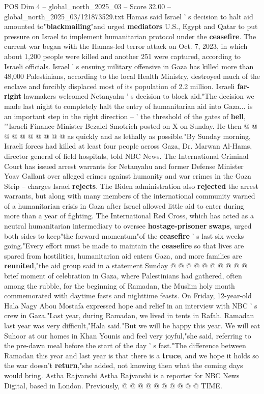 \begin{textsample}{POS Dim 4 – global\_north\_2025\_03 – Score 32.00 – global\_north\_2025\_03/121873529.txt}
Hamas said Israel ' s decision to halt aid amounted to"\textbf{blackmailing}"and urged \textbf{mediators} U.S., Egypt and Qatar to put pressure on Israel to implement humanitarian protocol under the \textbf{ceasefire}.
The current war began with the Hamas-led terror attack on Oct. 7, 2023, in which about 1,200 people were killed and another 251 were captured, according to Israeli officials.
Israel ' s ensuing military offensive in Gaza has killed more than 48,000 Palestinians, according to the local Health Ministry, destroyed much of the enclave and forcibly displaced most of its population of 2.2 million.
Israeli \textbf{far-right} lawmakers welcomed Netanyahu ' s decision to block aid."The decision we made last night to completely halt the entry of humanitarian aid into Gaza... is an important step in the right direction -- ' the threshold of the gates of \textbf{hell}, '"Israeli Finance Minister Bezalel Smotrich posted on X on Sunday.
He then @ @ @ @ @ @ @ @ @ @ as quickly and as lethally as possible."By Sunday morning, Israeli forces had killed at least four people across Gaza, Dr.
Marwan Al-Hams, director general of field hospitals, told NBC News.
The International Criminal Court has issued arrest warrants for Netanyahu and former Defense Minister Yoav Gallant over alleged crimes against humanity and war crimes in the Gaza Strip -- charges Israel \textbf{rejects}.
The Biden administration also \textbf{rejected} the arrest warrants, but along with many members of the international community warned of a humanitarian crisis in Gaza after Israel allowed little aid to enter during more than a year of fighting.
The International Red Cross, which has acted as a neutral humanitarian intermediary to oversee \textbf{hostage-prisoner} \textbf{swaps}, urged both sides to keep"the forward momentum"of the \textbf{ceasefire} ' s last six weeks going."Every effort must be made to maintain the \textbf{ceasefire} so that lives are spared from hostilities, humanitarian aid enters Gaza, and more families are \textbf{reunited},"the aid group said in a statement Sunday @ @ @ @ @ @ @ @ @ @ brief moment of celebration in Gaza, where Palestinians had gathered, often among the rubble, for the beginning of Ramadan, the Muslim holy month commemorated with daytime fasts and nighttime feasts.
On Friday, 12-year-old Hala Nagy Abou Mostafa expressed hope and relief in an interview with NBC ' s crew in Gaza."Last year, during Ramadan, we lived in tents in Rafah.
Ramadan last year was very difficult,"Hala said."But we will be happy this year.
We will eat Suhoor at our homes in Khan Younis and feel very joyful,"she said, referring to the pre-dawn meal before the start of the day ' s fast."The difference between Ramadan this year and last year is that there is a \textbf{truce}, and we hope it holds so the war doesn't \textbf{return},"she added, not knowing then what the coming days would bring.
Astha Rajvanshi Astha Rajvanshi is a reporter for NBC News Digital, based in London.
Previously, @ @ @ @ @ @ @ @ @ @ TIME.


\end{textsample}

